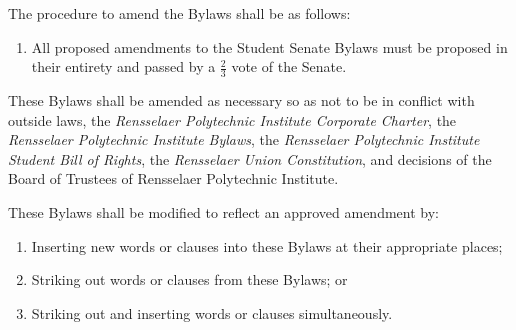 \begin{enumerate}
\item The procedure to amend the Bylaws shall be as follows:
\begin{enumerate}
\item All proposed amendments to the Student Senate Bylaws must be proposed in their entirety and passed by a $\frac{2}{3}$ vote of the
Senate.
\end{enumerate}

\item These Bylaws shall be amended as necessary so as not to be in conflict with outside laws, the \textit{Rensselaer Polytechnic Institute Corporate Charter}, the \textit{Rensselaer Polytechnic Institute Bylaws}, the \textit{Rensselaer Polytechnic Institute Student Bill of Rights}, the \textit{Rensselaer Union Constitution}, and decisions of the Board of Trustees of Rensselaer Polytechnic Institute.

{ \bf \item These Bylaws shall be modified to reflect an approved amendment by:
\begin{enumerate}
\item Inserting new words or clauses into these Bylaws at their appropriate places;
\item Striking out words or clauses from these Bylaws; or
\item Striking out and inserting words or clauses simultaneously.
\end{enumerate} }
\end{enumerate}
